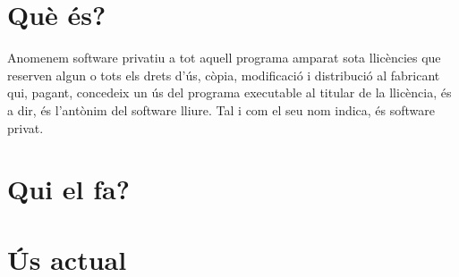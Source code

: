 \section{Què és?}

Anomenem software privatiu a tot aquell programa amparat sota llicències que reserven algun o tots els drets d'ús, còpia, modificació i distribució al fabricant qui, pagant, concedeix un ús del programa executable al titular de la llicència, és a dir, és l'antònim del software lliure. Tal i com el seu nom indica, és software privat.

\section{Qui el fa?}

\section{Ús actual}
